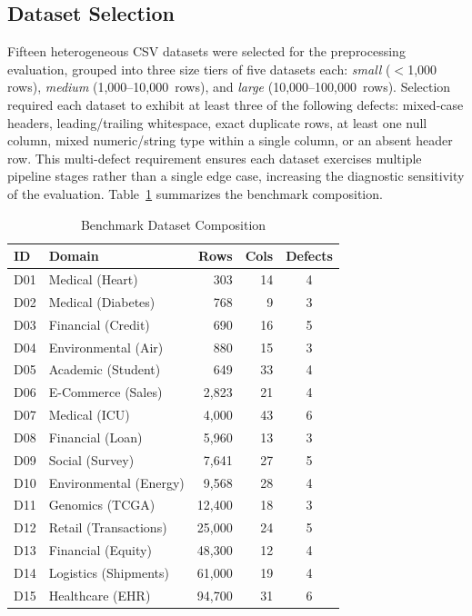 \documentclass[conference]{IEEEtran}
\begin{document}
\subsection{Dataset Selection}

Fifteen heterogeneous CSV datasets were selected for the preprocessing
evaluation, grouped into three size tiers of five datasets each:
\emph{small} ($<$1{,}000 rows), \emph{medium} (1{,}000--10{,}000~rows),
and \emph{large} (10{,}000--100{,}000~rows). Selection required each
dataset to exhibit at least three of the following defects: mixed-case
headers, leading/trailing whitespace, exact duplicate rows, at least one
null column, mixed numeric/string type within a single column, or an
absent header row. This multi-defect requirement ensures each dataset
exercises multiple pipeline stages rather than a single edge case,
increasing the diagnostic sensitivity of the evaluation.
Table~\ref{tab:datasets} summarizes the benchmark composition.

\begin{table}[t]
\centering
\caption{Benchmark Dataset Composition}
\label{tab:datasets}
\renewcommand{\arraystretch}{1.1}
\setlength{\tabcolsep}{3pt}
\begin{tabular}{llrrc}
\toprule
\textbf{ID} & \textbf{Domain} & \textbf{Rows} & \textbf{Cols}
            & \textbf{Defects} \\
\midrule
D01 & Medical (Heart)        &     303 & 14 & 4 \\
D02 & Medical (Diabetes)     &     768 &  9 & 3 \\
D03 & Financial (Credit)     &     690 & 16 & 5 \\
D04 & Environmental (Air)    &     880 & 15 & 3 \\
D05 & Academic (Student)     &     649 & 33 & 4 \\
\midrule
D06 & E-Commerce (Sales)     &   2{,}823 & 21 & 4 \\
D07 & Medical (ICU)          &   4{,}000 & 43 & 6 \\
D08 & Financial (Loan)       &   5{,}960 & 13 & 3 \\
D09 & Social (Survey)        &   7{,}641 & 27 & 5 \\
D10 & Environmental (Energy) &   9{,}568 & 28 & 4 \\
\midrule
D11 & Genomics (TCGA)        &  12{,}400 & 18 & 3 \\
D12 & Retail (Transactions)  &  25{,}000 & 24 & 5 \\
D13 & Financial (Equity)     &  48{,}300 & 12 & 4 \\
D14 & Logistics (Shipments)  &  61{,}000 & 19 & 4 \\
D15 & Healthcare (EHR)       &  94{,}700 & 31 & 6 \\
\bottomrule
\end{tabular}
\end{table}
\end{document}
